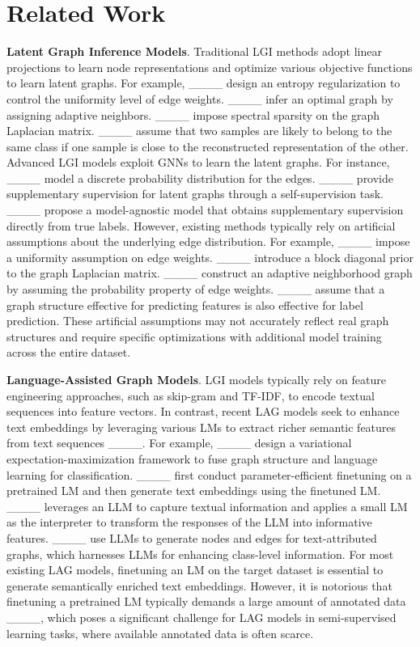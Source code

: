 \section{Related Work}
\textbf{Latent Graph Inference Models}. 
Traditional LGI methods adopt linear projections to learn node representations and optimize various objective functions to learn latent graphs.
For example, ____ design an entropy regularization to control the uniformity level of edge weights. ____ infer an optimal graph by assigning adaptive neighbors. ____ impose spectral sparsity on the graph Laplacian matrix.
____ assume that two samples are likely to belong to the same class if one sample is close to the reconstructed representation of the other.  
Advanced LGI models exploit GNNs to learn the latent graphs. 
For instance, ____ model a discrete probability distribution for the edges. 
____ provide supplementary supervision for latent graphs through a self-supervision task. 
____ propose a model-agnostic model that obtains supplementary supervision directly from true labels.
However, existing methods typically rely on artificial assumptions about the underlying edge distribution.
For example, ____ impose a uniformity assumption on edge weights.
____ introduce a block diagonal prior to the graph Laplacian matrix.
____ construct an adaptive neighborhood graph by assuming the probability property of edge weights.
____ assume that a graph structure effective for predicting features is also effective for label prediction.
{These artificial assumptions may not accurately reflect real graph structures and require specific optimizations with additional model training across the entire dataset.} 







 

\textbf{Language-Assisted Graph Models}.
LGI models typically rely on feature engineering approaches, such as skip-gram and TF-IDF, to encode textual sequences into feature vectors. 
In contrast, recent LAG models seek to enhance text embeddings by leveraging various LMs to extract richer semantic features from text sequences ____.
For example, ____ design a variational expectation-maximization framework to fuse graph structure and language learning for classification.
____ first conduct parameter-efficient finetuning on a pretrained LM and then generate text embeddings using the finetuned LM. 
____ leverages an LLM to capture textual information and applies a small LM as the interpreter to transform the responses of the LLM into informative features. 
____ use LLMs to generate nodes and edges for text-attributed graphs, which harnesses LLMs for enhancing class-level information.
For most existing LAG models, finetuning an LM on the target dataset is essential to generate semantically enriched text embeddings. 
However, it is notorious that finetuning a pretrained LM typically demands a large amount of annotated data ____, which poses a significant challenge for LAG models in semi-supervised learning tasks, where available annotated data is often scarce.